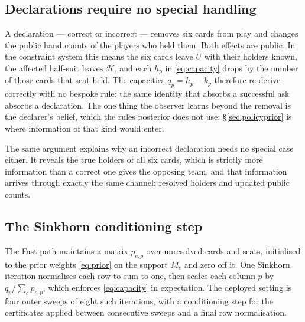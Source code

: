 \subsection{Declarations require no special handling}
\label{app:decl}

A declaration --- correct or incorrect --- removes six cards from play and
changes the public hand counts of the players who held them. Both effects are
public. In the constraint system this means the six cards leave $U$ with their
holders known, the affected half-suit leaves $\mathcal{H}$, and each $h_p$ in
\eqref{eq:capacity} drops by the number of those cards that seat held. The
capacities $q_p = h_p - k_p$ therefore re-derive correctly with no bespoke rule:
the same identity that absorbs a successful ask absorbs a declaration. The one
thing the observer learns beyond the removal is the declarer's belief, which the
rules posterior does not use; \S\ref{sec:policyprior} is where information of
that kind would enter.

The same argument explains why an incorrect declaration needs no special case
either. It reveals the true holders of all six cards, which is strictly more
information than a correct one gives the opposing team, and that information
arrives through exactly the same channel: resolved holders and updated public
counts.

\subsection{The Sinkhorn conditioning step}
\label{app:sinkhorn}

The Fast path maintains a matrix $p_{c,p}$ over unresolved cards and seats,
initialised to the prior weights \eqref{eq:prior} on the support $M_c$ and zero
off it. One Sinkhorn iteration normalises each row to sum to one, then scales
each column $p$ by $q_p / \sum_c p_{c,p}$, which enforces \eqref{eq:capacity} in
expectation. The deployed setting is four outer sweeps of eight such iterations,
with a conditioning step for the certificates applied between consecutive sweeps
and a final row normalisation.

